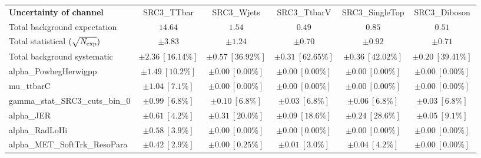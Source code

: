 
\begin{sidewaystable}
\begin{center}
\setlength{\tabcolsep}{0.0pc}
\begin{tabular*}{\textwidth}{@{\extracolsep{\fill}}lccccc}
\noalign{\smallskip}\hline\noalign{\smallskip}
{\bf Uncertainty of channel}                                    & SRC3\_TTbar            & SRC3\_Wjets            & SRC3\_TtbarV            & SRC3\_SingleTop            & SRC3\_Diboson            \\
\noalign{\smallskip}\hline\noalign{\smallskip}
Total background expectation             &  $14.64$        &  $1.54$        &  $0.49$        &  $0.85$        &  $0.51$       \\
\noalign{\smallskip}\hline\noalign{\smallskip}
Total statistical $(\sqrt{N_{\rm exp}})$              & $\pm 3.83$        & $\pm 1.24$        & $\pm 0.70$        & $\pm 0.92$        & $\pm 0.71$       \\
Total background systematic               & $\pm 2.36\ [16.14\%] $        & $\pm 0.57\ [36.92\%] $        & $\pm 0.31\ [62.65\%] $        & $\pm 0.36\ [42.02\%] $        & $\pm 0.20\ [39.41\%] $             \\
\noalign{\smallskip}\hline\noalign{\smallskip}
\noalign{\smallskip}\hline\noalign{\smallskip}
alpha\_PowhegHerwigpp         & $\pm 1.49\ [10.2\%] $          & $\pm 0.00\ [0.00\%] $          & $\pm 0.00\ [0.00\%] $          & $\pm 0.00\ [0.00\%] $          & $\pm 0.00\ [0.00\%] $       \\
mu\_ttbarC         & $\pm 1.04\ [7.1\%] $          & $\pm 0.00\ [0.00\%] $          & $\pm 0.00\ [0.00\%] $          & $\pm 0.00\ [0.00\%] $          & $\pm 0.00\ [0.00\%] $       \\
gamma\_stat\_SRC3\_cuts\_bin\_0         & $\pm 0.99\ [6.8\%] $          & $\pm 0.10\ [6.8\%] $          & $\pm 0.03\ [6.8\%] $          & $\pm 0.06\ [6.8\%] $          & $\pm 0.03\ [6.8\%] $       \\
alpha\_JER         & $\pm 0.61\ [4.2\%] $          & $\pm 0.31\ [20.0\%] $          & $\pm 0.09\ [18.6\%] $          & $\pm 0.24\ [28.6\%] $          & $\pm 0.05\ [9.1\%] $       \\
alpha\_RadLoHi         & $\pm 0.58\ [3.9\%] $          & $\pm 0.00\ [0.00\%] $          & $\pm 0.00\ [0.00\%] $          & $\pm 0.00\ [0.00\%] $          & $\pm 0.00\ [0.00\%] $       \\
alpha\_MET\_SoftTrk\_ResoPara         & $\pm 0.42\ [2.9\%] $          & $\pm 0.00\ [0.25\%] $          & $\pm 0.01\ [3.0\%] $          & $\pm 0.04\ [4.2\%] $          & $\pm 0.00\ [0.00\%] $       \\

\end{tabular*}
\end{center}
\end{sidewaystable}
